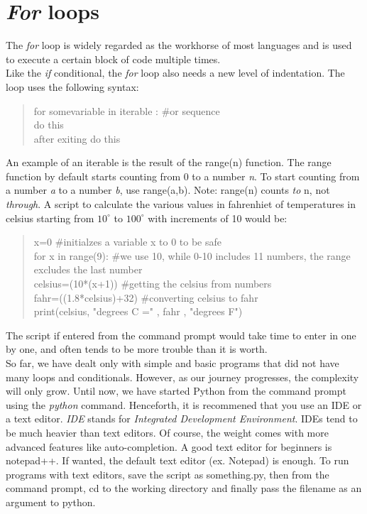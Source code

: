 \section{\emph{For} loops}
The \emph{for} loop is widely regarded as the workhorse of most languages and is used to execute a certain block of code multiple times.\\
Like the \emph{if} conditional, the \emph{for} loop also needs a new level of indentation. The loop uses the following syntax:
\begin{quote}
for somevariable in iterable : \#or sequence\\
\tab do this\\
after exiting do this
\end{quote}
An example of an iterable is the result of the range(n) function. The range function by default starts counting from 0 to a number \emph{n}. To start counting from a number \emph{a} to a number \emph{b}, use range(a,b). Note: range(n) counts \emph{to} n, not \emph{through}.
A script to calculate the various values in fahrenhiet of temperatures in celsius starting from $10^\circ$ to $100^\circ$ with increments of 10 would be:
\begin{quote}
x=0 \tab \#initialzes a variable x to 0 to be safe\\
for x in range(9): \tab \#we use 10, while 0-10 includes 11 numbers, the range excludes the last number\\
\tab celsius=(10*(x+1)) \tab \#getting the celsius from numbers\\
\tab fahr=((1.8*celsius)+32) \tab \#converting celsius to fahr\\
\tab print(celsius, "degrees C =" , fahr , "degrees F")
\end{quote}
The script if entered from the command prompt would take time to enter in one by one, and often tends to be more trouble than it is worth.
\\
So far, we have dealt only with simple and basic programs that did not have many loops and conditionals. However, as our journey progresses, the complexity will only grow. Until now, we have started Python from the command prompt using the \emph{python} command. Henceforth, it is recommened that you use an IDE or a text editor. \emph{IDE} stands for \emph{Integrated Development Environment}. IDEs tend to be much heavier than text editors. Of course, the weight comes with more advanced features like auto-completion. A good text editor for beginners is notepad++. If wanted, the default text editor (ex. Notepad) is enough. To run programs with text editors, save the script as something.py, then from the command prompt, cd to the working directory and finally pass the filename as an argument to python.\\ 
